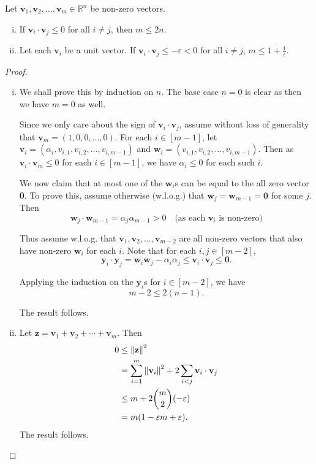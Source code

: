 \begin{lemma}
\label{geometricLemma}
    Let $\textbf{v}_1,\textbf{v}_2,\ldots,\textbf{v}_m\in\mathbb{R}^n$ be non-zero vectors.
    \begin{enumerate}[(i)]
        \item If $\textbf{v}_i\cdot \textbf{v}_j\leq 0$ for all $i\neq j$, then $m\leq 2n$.
        \item Let each $\textbf{v}_i$ be a unit vector. If $\textbf{v}_i\cdot \textbf{v}_j\leq -\varepsilon< 0$ for all $i\neq j$, $m\leq 1+\frac{1}{\varepsilon}$.
    \end{enumerate}
\end{lemma}
\begin{proof}
    \phantom{owo}
    \begin{enumerate}[(i)]
        \item We shall prove this by induction on $n$. The base case $n=0$ is clear as then we have $m=0$ as well.
        
        Since we only care about the sign of $\textbf{v}_i\cdot \textbf{v}_j$, assume without loss of generality that $\textbf{v}_m=(1,0,0,\ldots,0)$. For each $i\in[m-1]$, let $\textbf{v}_i=(\alpha_i,v_{i,1},v_{i,2},\ldots,v_{i,m-1})$ and $\textbf{w}_i=(v_{i,1},v_{i,2},\ldots,v_{i,m-1})$. Then as $\textbf{v}_i\cdot \textbf{v}_m\leq 0$ for each $i\in[m-1]$, we have $\alpha_i\leq 0$ for each such $i$.
        
        We now claim that at most one of the $\textbf{w}_i$s can be equal to the all zero vector \textbf{0}. To prove this, assume otherwise (w.l.o.g.) that $\textbf{w}_j=\textbf{w}_{m-1}=\textbf{0}$ for some $j$. Then
        $$\textbf{w}_j\cdot\textbf{w}_{m-1}=\alpha_j\alpha_{m-1}>0 \quad \text{(as each $\textbf{v}_i$ is non-zero)}$$
        
        Thus assume w.l.o.g. that $\textbf{v}_1,\textbf{v}_2,\ldots,\textbf{v}_{m-2}$ are all non-zero vectors that also have non-zero $\textbf{w}_i$ for each $i$. Note that for each $i,j\in[m-2]$,
        $$\textbf{y}_i\cdot\textbf{y}_j=\textbf{w}_i\textbf{w}_j-\alpha_i\alpha_j\leq \textbf{v}_i\cdot \textbf{v}_j\leq \textbf{0}.$$
        
        Applying the induction on the $\textbf{y}_i$s for $i\in[m-2]$, we have
        $$m-2\leq 2(n-1).$$
        
        The result follows.
        
        \item Let $\textbf{z}=\textbf{v}_1+\textbf{v}_2+\cdots+\textbf{v}_m.$ Then
        \begin{align*}
            0 &\leq \left\lVert\textbf{z}\right\rVert^2 \\
            &= \sum_{i=1}^m\left\lVert\textbf{v}_i\right\rVert^2+2\sum_{i<j}\textbf{v}_i\cdot\textbf{v}_j \\
            &\leq m + 2\binom{m}{2}(-\varepsilon) \\
            &= m(1-\varepsilon m+\varepsilon).
        \end{align*}
        The result follows.
    \end{enumerate}
\end{proof}

\clearpage